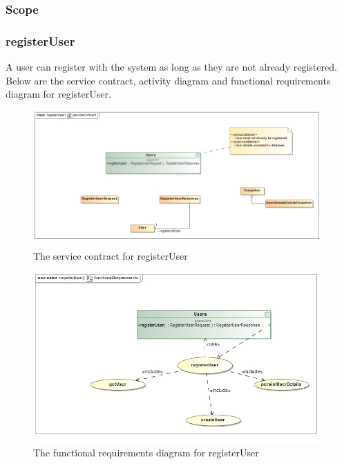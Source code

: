 \subsubsection{Scope}


\subsubsection{registerUser}

A user can register with the system as long as they are not already registered. Below are the service contract, activity diagram and functional requirements diagram for registerUser.

\begin{figure}[H]
	\centering
	\includegraphics[width=1.0\textwidth]{../images/funcReq/registerUserServiceContract.jpg}
	\caption{The service contract for registerUser \label{overflow}}
\end{figure}

\begin{figure}[H]
	\centering
	\includegraphics[width=1.0\textwidth]{../images/funcReq/registerUserFunctionalRequirements.jpg}
	\caption{The functional requirements diagram for registerUser \label{overflow}}
\end{figure}

